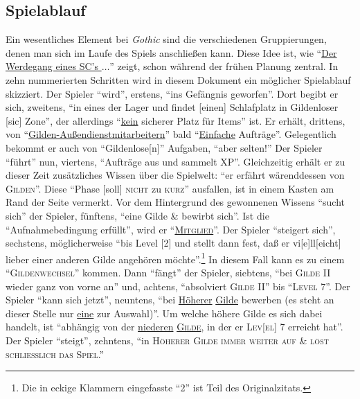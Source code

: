\documentclass[a5paper,pagesize,numbers=noenddot]{scrbook}
\begin{document}
\subsection{Spielablauf}\label{sec:orpheus_geschichte_spielablauf}
Ein wesentliches Element bei \textit{Gothic} sind die verschiedenen Gruppierungen, denen man sich im Laufe des Spiels anschließen kann.
Diese Idee ist, wie \enquote{\uline{Der Werdegang eines SC's $\ldots$}} zeigt, schon während der frühen Planung zentral.
In zehn nummerierten Schritten wird in diesem Dokument ein möglicher Spiel\-ablauf skizziert.
Der Spieler \enquote{wird}, erstens, \enquote{ins Gefängnis geworfen}.
Dort begibt er sich, zweitens, \enquote{in eines der Lager und findet [einen] Schlafplatz in Gildenloser [sic] Zone}, der allerdings \enquote{\uline{kein} sicherer Platz für Items} ist.
Er erhält, drittens, von \enquote{\uline{Gilden-Außendienstmitarbeitern}} bald \enquote{\uline{Einfache} Aufträge}.
Gelegentlich bekommt er auch von \enquote{Gildenlose[n]} Aufgaben, \enquote{aber selten!}
Der Spieler \enquote{führt} nun, viertens, \enquote{Aufträge aus und sammelt XP}.
Gleichzeitig erhält er zu dieser Zeit zusätzliches Wissen über die Spielwelt: \enquote{er erfährt wärenddessen von \textsc{Gilden}}.
Diese \enquote{Phase [soll] \textsc{nicht} zu \textsc{kurz}} ausfallen, ist in einem Kasten am Rand der Seite vermerkt.
Vor dem Hintergrund des gewonnenen Wissens \enquote{sucht sich} der Spieler, fünftens, \enquote{eine Gilde \& bewirbt sich}.
Ist die \enquote{Aufnahmebedingung erfüllt}, wird er \enquote{\textsc{\uline{Mitglied}}}.
Der Spieler \enquote{steigert sich}, sechstens, möglicherweise \enquote{bis Level [2] und stellt dann fest, daß er vi[e]ll[eicht] lieber einer anderen Gilde angehören möchte}.\footnote{Die in eckige Klammern eingefasste \enquote{2} ist Teil des Originalzitats.}
In diesem Fall kann es zu einem \enquote{\textsc{Gildenwechsel}} kommen.
Dann \enquote{fängt} der Spieler, siebtens, \enquote{bei \textsc{Gilde} II wieder ganz von vorne an} und, achtens, \enquote{absolviert \textsc{Gilde} II} bis \enquote{\textsc{Level} 7}.
Der Spieler \enquote{kann sich jetzt}, neuntens, \enquote{bei \uline{Höherer} \uline{Gilde} bewerben (es steht an dieser Stelle nur \uline{eine} zur Auswahl)}.
Um welche höhere Gilde es sich dabei handelt, ist \enquote{abhängig von der \uline{niederen} \textsc{\uline{Gilde}}, in der er \textsc{Lev[el]} 7 erreicht hat}.
Der Spieler \enquote{steigt}, zehntens, \enquote{in \textsc{Höherer Gilde immer weiter auf \& löst schliesslich das Spiel}.}
\end{document}
